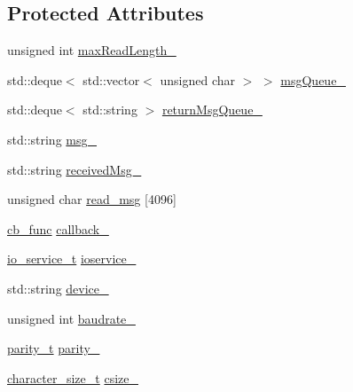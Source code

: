 \subsection*{Protected Attributes}
\begin{DoxyCompactItemize}
\item 
unsigned int \hyperlink{classo_cpt_1_1protocol_1_1_serial_a944ac0bfaeea6bd223ef736f1e9e318c}{max\+Read\+Length\+\_\+}
\item 
std\+::deque$<$ std\+::vector$<$ unsigned char $>$ $>$ \hyperlink{classo_cpt_1_1protocol_1_1_serial_a220138abdeaa8734f9f9b1b1ecd8ccd8}{msg\+Queue\+\_\+}
\item 
std\+::deque$<$ std\+::string $>$ \hyperlink{classo_cpt_1_1protocol_1_1_serial_aeed234980f18b4b66f8c88c50d6188f8}{return\+Msg\+Queue\+\_\+}
\item 
std\+::string \hyperlink{classo_cpt_1_1protocol_1_1_serial_a418ed31316844cd2ea8bc6edd89e9619}{msg\+\_\+}
\item 
std\+::string \hyperlink{classo_cpt_1_1protocol_1_1_serial_a9a442122381d39a30c4d4b231e17752e}{received\+Msg\+\_\+}
\item 
unsigned char \hyperlink{classo_cpt_1_1protocol_1_1_serial_ac8f897b596772bb6923dfcdf0817bc8b}{read\+\_\+msg} \mbox{[}4096\mbox{]}
\item 
\hyperlink{classo_cpt_1_1protocol_1_1_serial_ad55591180be8bea2fe3832b1265b7496}{cb\+\_\+func} \hyperlink{classo_cpt_1_1protocol_1_1_serial_a653c57dab573b8f0d6d06e0f1443d045}{callback\+\_\+}
\item 
\hyperlink{classo_cpt_1_1protocol_1_1_serial_ac9305799ef4be4eb50f1274184492f04}{io\+\_\+service\+\_\+t} \hyperlink{classo_cpt_1_1protocol_1_1_serial_a313201e80bdb7495b837960c16d244a2}{ioservice\+\_\+}
\item 
std\+::string \hyperlink{classo_cpt_1_1protocol_1_1_serial_aef59f7008f19eb073071a836b923c47e}{device\+\_\+}
\item 
unsigned int \hyperlink{classo_cpt_1_1protocol_1_1_serial_ad24eda3d37c870d3f83af0a67d63d2ae}{baudrate\+\_\+}
\item 
\hyperlink{classo_cpt_1_1protocol_1_1_serial_aae21a39fe2f321475ca19d46bf40d5f3}{parity\+\_\+t} \hyperlink{classo_cpt_1_1protocol_1_1_serial_a2b7e174e85959fcb20bb9cb26fecafc1}{parity\+\_\+}
\item 
\hyperlink{classo_cpt_1_1protocol_1_1_serial_a8799e83d5d812132c296dd4a6a17d6f6}{character\+\_\+size\+\_\+t} \hyperlink{classo_cpt_1_1protocol_1_1_serial_ab64a625816c6697c301c5d6c79612044}{csize\+\_\+}
\item 

\end{DoxyCompactItemize}
